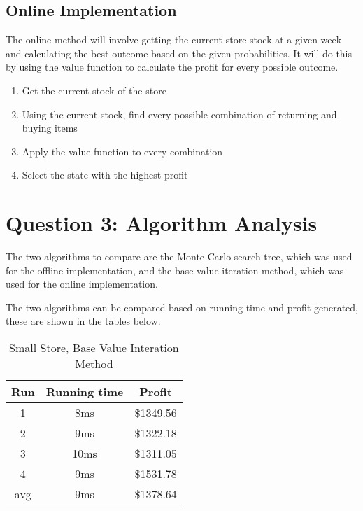 \documentclass[12pt]{article}
\begin{document}
    \subsection{Online Implementation}

    The online method will involve getting the current store stock at a given week and calculating the best outcome based on the given probabilities. It will do this by using the value function to calculate the profit for every possible outcome.

    \begin{enumerate}
        \item Get the current stock of the store
        \item Using the current stock, find every possible combination of returning and buying items
        \item Apply the value function to every combination
        \item Select the state with the highest profit
    \end{enumerate}

    \section{Question 3: Algorithm Analysis}

    The two algorithms to compare are the Monte Carlo search tree, which was used for the offline implementation, and the base value iteration method, which was used for the online implementation.

    The two algorithms can be compared based on running time and profit generated, these are shown in the tables below.

    \begin{table}
        \centering
        \begin{tabular}{ |c|c|c| }
            \hline
            Run & Running time & Profit \\
            \hline
            1 & 8ms & \$1349.56\\
            2 & 9ms & \$1322.18\\
            3 & 10ms & \$1311.05\\
            4 & 9ms & \$1531.78\\
            avg & 9ms & \$1378.64\\
            \hline
        \end{tabular}

        \caption{Small Store, Base Value Interation Method}
    \end{table}
\end{document}
